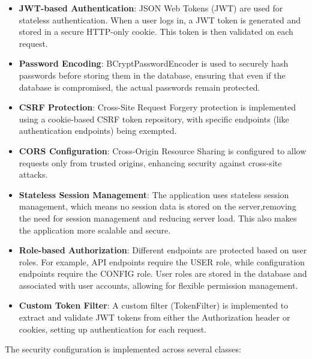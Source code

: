 \begin{itemize}
    \item \textbf{JWT-based Authentication}: JSON Web Tokens (JWT) are used for stateless authentication.
    When a user logs in, a JWT token is generated and stored in a secure HTTP-only cookie.
    This token is then validated on each request.

    \item \textbf{Password Encoding}: BCryptPasswordEncoder is used to securely hash passwords before storing them in the database, ensuring that even if the database is compromised, the actual passwords remain protected.

    \item \textbf{CSRF Protection}: Cross-Site Request Forgery protection is implemented using a cookie-based CSRF token repository, with specific endpoints (like authentication endpoints) being exempted.

    \item \textbf{CORS Configuration}: Cross-Origin Resource Sharing is configured to allow requests only from trusted origins, enhancing security against cross-site attacks.

    \item \textbf{Stateless Session Management}: The application uses stateless session management, which means no session data is stored on the server,removing the need for session management and reducing server load.
    This also makes the application more scalable and secure.

    \item \textbf{Role-based Authorization}: Different endpoints are protected based on user roles.
    For example, API endpoints require the USER role, while configuration endpoints require the CONFIG role.
    User roles are stored in the database and associated with user accounts, allowing for flexible permission management.

    \item \textbf{Custom Token Filter}: A custom filter (TokenFilter) is implemented to extract and validate JWT tokens from either the Authorization header or cookies, setting up authentication for each request.
\end{itemize}

The security configuration is implemented across several classes:

